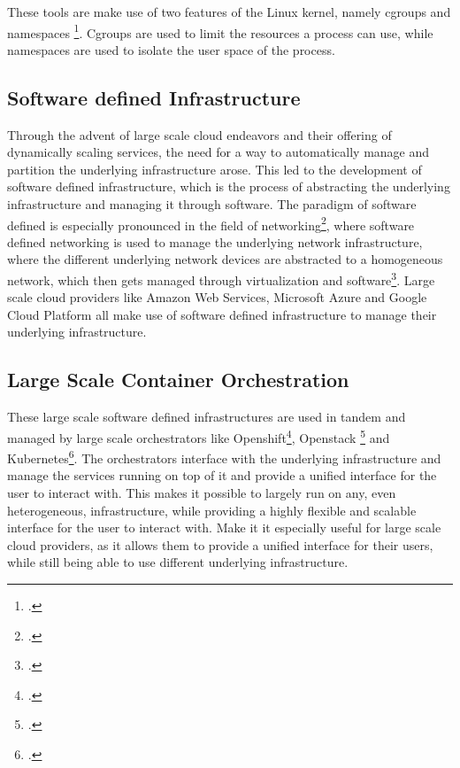 These tools are make use of two features of the Linux kernel, namely cgroups and namespaces \footcite{WhatContainerDocker}.
Cgroups are used to limit the resources a process can use, while namespaces are used to isolate the user space of the process.

\subsection*{Software defined Infrastructure}

Through the advent of large scale cloud endeavors and their offering of dynamically scaling services, the need for a way to automatically manage and partition the underlying infrastructure arose.
This led to the development of software defined infrastructure, which is the process of abstracting the underlying infrastructure and managing it through software.
The paradigm of software defined is especially pronounced in the field of networking\footcite{xiaSurveySoftwareDefinedNetworking2015}, where software defined networking is used to manage the underlying network infrastructure,
where the different underlying network devices are abstracted to a homogeneous network, which then gets managed through virtualization and software\footcite{baurCloudOrchestrationFeatures2015}.
Large scale cloud providers like Amazon Web Services, Microsoft Azure and Google Cloud Platform all make use of software defined infrastructure to manage their underlying infrastructure.

\subsection*{Large Scale Container Orchestration}

These large scale software defined infrastructures are used in tandem and managed by large scale orchestrators like Openshift\footcite{RedHatOpenShift}, Openstack \footcite{OpenSourceCloud} and Kubernetes\footcite{ProductionGradeContainerOrchestration}. 
The orchestrators interface with the underlying infrastructure and manage the services running on top of it and provide a unified interface for the user to interact with.
This makes it possible to largely run on any, even heterogeneous, infrastructure, while providing a highly flexible and scalable interface for the user to interact with.
Make it it especially useful for large scale cloud providers, as it allows them to provide a unified interface for their users, while still being able to use different underlying infrastructure.

